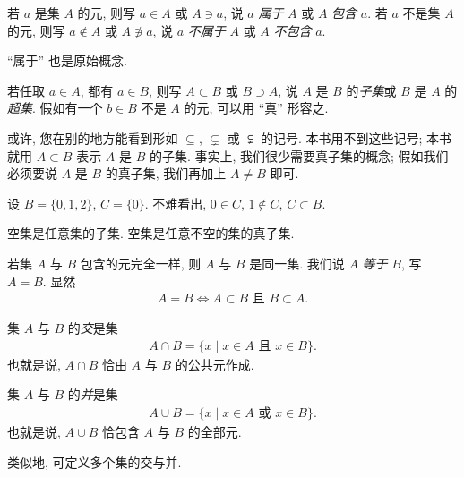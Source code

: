 \begin{definition}
    若 $a$ 是集 $A$ 的元, 则写 $a \in A$ 或 $A \ni a$, 说 $a$ \emph{属于} $A$ 或 $A$ \emph{包含} $a$. 若 $a$ 不是集 $A$ 的元, 则写 $a \notin A$ 或 $A \not\ni a$, 说 $a$ \emph{不属于} $A$ 或 $A$ \emph{不包含} $a$.
\end{definition}

\begin{remark}
    ``属于'' 也是原始概念.
\end{remark}

\begin{definition}
    若任取 $a \in A$, 都有 $a \in B$, 则写 $A \subset B$ 或 $B \supset A$, 说 $A$ 是 $B$ 的\emph{子集}或 $B$ 是 $A$ 的\emph{超集}. 假如有一个 $b \in B$ 不是 $A$ 的元, 可以用 ``真'' 形容之.
\end{definition}

\begin{remark}
    或许, 您在别的地方能看到形如 $\subseteq$, $\subsetneq$ 或 $\subsetneqq$ 的记号. 本书用不到这些记号; 本书就用 $A \subset B$ 表示 $A$ 是 $B$ 的子集. 事实上, 我们很少需要真子集的概念; 假如我们必须要说 $A$ 是 $B$ 的真子集, 我们再加上 $A \neq B$ 即可.
\end{remark}

\begin{example}
    设 $B = \{ 0,1,2 \}$, $C = \{ 0 \}$. 不难看出, $0 \in C$, $1 \notin C$, $C \subset B$.
\end{example}

\begin{remark}
    空集是任意集的子集. 空集是任意不空的集的真子集.
\end{remark}

\begin{definition}
    若集 $A$ 与 $B$ 包含的元完全一样, 则 $A$ 与 $B$ 是同一集. 我们说 $A$ \emph{等于} $B$, 写 $A = B$. 显然
    \begin{align*}
        A = B \iff \text{$A \subset B$ 且 $B \subset A$}.
    \end{align*}
\end{definition}

\begin{definition}
    集 $A$ 与 $B$ 的\emph{交}是集
    \begin{align*}
        A \cap B = \{ x \mid \text{$x \in A$ 且 $x \in B$} \}.
    \end{align*}
    也就是说, $A \cap B$ 恰由 $A$ 与 $B$ 的公共元作成.

    集 $A$ 与 $B$ 的\emph{并}是集
    \begin{align*}
        A \cup B = \{ x \mid \text{$x \in A$ 或 $x \in B$} \}.
    \end{align*}
    也就是说, $A \cup B$ 恰包含 $A$ 与 $B$ 的全部元.

    类似地, 可定义多个集的交与并.
\end{definition}

